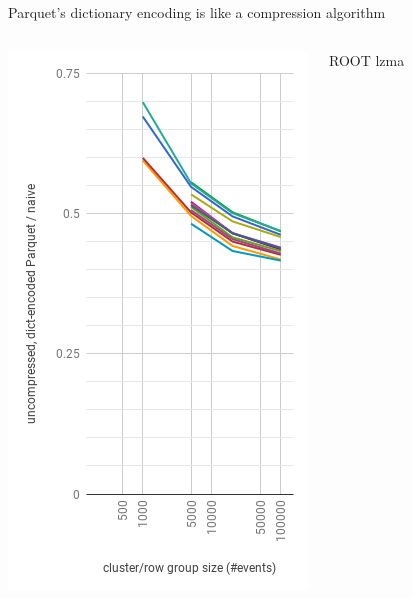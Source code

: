 \documentclass[aspectratio=169]{beamer}
\begin{document}
\begin{frame}{Parquet's dictionary encoding is like a compression algorithm}
\begin{columns}
\begin{center}
\includegraphics[width=\linewidth]{parquet-dict.png}
\end{center}
\begin{center}
\mbox{\hspace{3 cm}}
ROOT lzma


\end{center}
\end{columns}
\end{frame}
\end{document}
